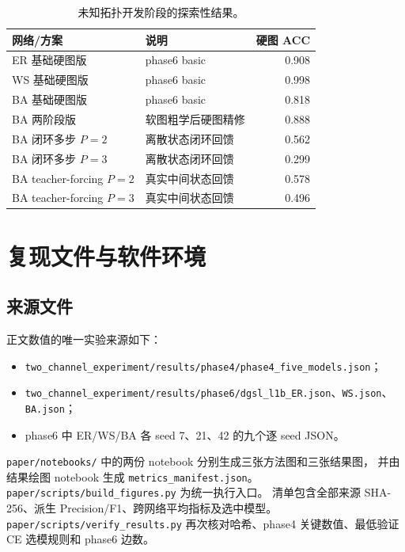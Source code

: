 \begin{table}[H]
  \centering
  \caption{未知拓扑开发阶段的探索性结果。}
  \label{tab:negative-results}
  \begin{tabularx}{0.92\textwidth}{@{}lXr@{}}
    \toprule
    网络/方案 & 说明 & 硬图 ACC \\
    \midrule
    ER 基础硬图版 & phase6 basic & 0.908 \\
    WS 基础硬图版 & phase6 basic & 0.998 \\
    BA 基础硬图版 & phase6 basic & 0.818 \\
    BA 两阶段版 & 软图粗学后硬图精修 & 0.888 \\
    BA 闭环多步 $P=2$ & 离散状态闭环回馈 & 0.562 \\
    BA 闭环多步 $P=3$ & 离散状态闭环回馈 & 0.299 \\
    BA teacher-forcing $P=2$ & 真实中间状态回馈 & 0.578 \\
    BA teacher-forcing $P=3$ & 真实中间状态回馈 & 0.496 \\
    \bottomrule
  \end{tabularx}
\end{table}

\section{复现文件与软件环境}

\subsection{来源文件}

正文数值的唯一实验来源如下：
\begin{itemize}
  \item \nolinkurl{two_channel_experiment/results/phase4/phase4_five_models.json}；
  \item \nolinkurl{two_channel_experiment/results/phase6/dgsl_l1b_ER.json}、\nolinkurl{WS.json}、\nolinkurl{BA.json}；
  \item phase6 中 ER/WS/BA 各 seed 7、21、42 的九个逐 seed JSON。
\end{itemize}
\nolinkurl{paper/notebooks/} 中的两份 notebook 分别生成三张方法图和三张结果图，
并由结果绘图 notebook 生成 \nolinkurl{metrics_manifest.json}。
\nolinkurl{paper/scripts/build_figures.py} 为统一执行入口。
清单包含全部来源 SHA-256、派生 Precision/F1、跨网络平均指标及选中模型。
\nolinkurl{paper/scripts/verify_results.py} 再次核对哈希、phase4 关键数值、最低验证 CE 选模规则和 phase6 边数。

